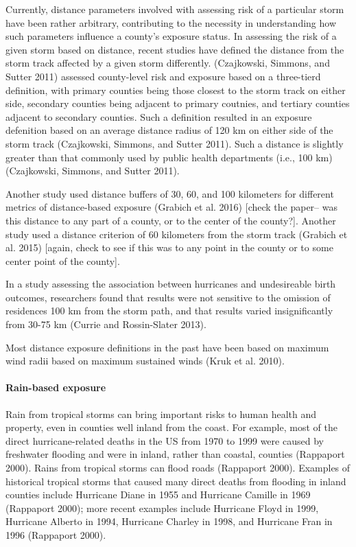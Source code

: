 \documentclass[]{elsarticle} %
\begin{document}
Currently, distance parameters involved with assessing risk of a
particular storm have been rather arbitrary, contributing to the
necessity in understanding how such parameters influence a county's
exposure status. In assessing the risk of a given storm based on
distance, recent studies have defined the distance from the storm track
affected by a given storm differently. (Czajkowski, Simmons, and Sutter
2011) assessed county-level risk and exposure based on a three-tierd
definition, with primary counties being those closest to the storm track
on either side, secondary counties being adjacent to primary coutnies,
and tertiary counties adjacent to secondary counties. Such a definition
resulted in an exposure defenition based on an average distance radius
of 120 km on either side of the storm track (Czajkowski, Simmons, and
Sutter 2011). Such a distance is slightly greater than that commonly
used by public health departments (i.e., 100 km) (Czajkowski, Simmons,
and Sutter 2011).

Another study used distance buffers of 30, 60, and 100 kilometers for
different metrics of distance-based exposure (Grabich et al. 2016)
{[}check the paper-- was this distance to any part of a county, or to
the center of the county?{]}. Another study used a distance criterion of
60 kilometers from the storm track (Grabich et al. 2015) {[}again, check
to see if this was to any point in the county or to some center point of
the county{]}.

In a study assessing the association between hurricanes and undesireable
birth outcomes, researchers found that results were not sensitive to the
omission of residences 100 km from the storm path, and that results
varied insignificantly from 30-75 km (Currie and Rossin-Slater 2013).

Most distance exposure definitions in the past have been based on
maximum wind radii based on maximum sustained winds (Kruk et al. 2010).

\paragraph{Rain-based exposure}\label{rain-based-exposure-1}

Rain from tropical storms can bring important risks to human health and
property, even in counties well inland from the coast. For example, most
of the direct hurricane-related deaths in the US from 1970 to 1999 were
caused by freshwater flooding and were in inland, rather than coastal,
counties (Rappaport 2000). Rains from tropical storms can flood roads
(Rappaport 2000). Examples of historical tropical storms that caused
many direct deaths from flooding in inland counties include Hurricane
Diane in 1955 and Hurricane Camille in 1969 (Rappaport 2000); more
recent examples include Hurricane Floyd in 1999, Hurricane Alberto in
1994, Hurricane Charley in 1998, and Hurricane Fran in 1996 (Rappaport
2000).
\end{document}
